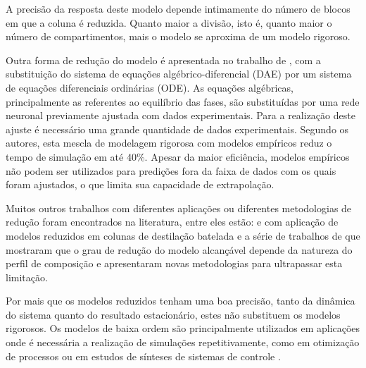 A precisão da resposta deste modelo depende intimamente do número de blocos em que a coluna é reduzida. Quanto maior a
divisão, isto é, quanto maior o número de compartimentos, mais o modelo se aproxima de um modelo rigoroso.

Outra forma de redução do modelo é apresentada no trabalho de , com 
a substituição do sistema de equações algébrico-diferencial (DAE) por um sistema de
equações diferenciais ordinárias (ODE). As equações algébricas, principalmente as referentes ao equilíbrio das fases, são
substituídas por uma rede neuronal previamente ajustada com dados experimentais. Para a realização deste ajuste
é necessário uma grande quantidade de dados experimentais. Segundo os autores, esta mescla de modelagem rigorosa com modelos
empíricos reduz o tempo de simulação em até 40\%. Apesar da maior eficiência, modelos empíricos
não podem ser utilizados para predições fora da faixa de dados com os quais foram ajustados, o que limita sua
capacidade de extrapolação.

Muitos outros trabalhos com diferentes aplicações ou diferentes metodologias de redução foram encontrados
na literatura, entre eles estão:  e  com aplicação de modelos
reduzidos em colunas de destilação batelada e a série de trabalhos de \citeauthor{Srivastava:1985} que
mostraram que o grau de redução do
modelo alcançável depende da natureza do perfil de composição e apresentaram novas
metodologias para ultrapassar esta limitação.

Por mais que os modelos reduzidos tenham uma boa precisão, tanto da dinâmica do sistema quanto do resultado estacionário,
estes não substituem os modelos rigorosos. Os modelos de baixa ordem são principalmente utilizados em aplicações onde é
necessária a realização de simulações repetitivamente, como em otimização de processos ou em estudos de sínteses de
sistemas de controle \cite{Cho:1984}.


